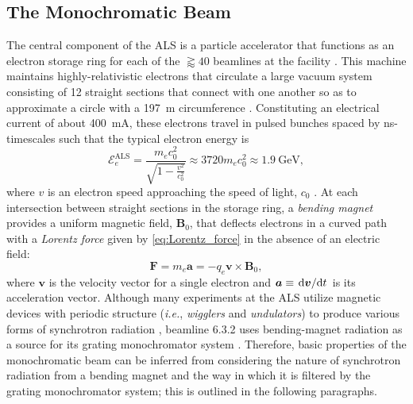 \subsection{The Monochromatic Beam}\label{sec:als_beam}
The central component of the ALS is a particle accelerator that functions as an electron storage ring for each of the $\gtrapprox 40$ beamlines at the facility \cite{ALS_about}. 
This machine maintains highly-relativistic electrons that circulate a large vacuum system consisting of \num{12} straight sections that connect with one another so as to approximate a circle with a \SI{197}{\metre} circumference \cite{Attwood17}. 
Constituting an electrical current of about \SI{400}{\milli\ampere}, these electrons travel in pulsed bunches spaced by \si{\nano\second}-timescales such that the typical electron energy is
\begin{equation}\label{eq:ALS_energy}
 \mathcal{E}_e^{\text{ALS}} = \frac{m_e c_0^2}{\sqrt{1-\frac{v^2}{c_0^2}}} \approx \num{3720} m_e c_0^2 \approx \SI{1.9}{\giga\electronvolt} ,
 \end{equation}
where $v$ is an electron speed approaching the speed of light, $c_0$ \cite{Attwood17,Underwood96}.
At each intersection between straight sections in the storage ring, a \emph{bending magnet} provides a uniform magnetic field, $\mathbold{B}_0$, that deflects electrons in a curved path with a \emph{Lorentz force} given by \cref{eq:Lorentz_force} in the absence of an electric field:
\begin{equation}\label{eq:Lorentz_force_3}
 \mathbold{F} = m_e \mathbold{a} = - q_e \mathbold{v} \times \mathbold{B}_0 ,
 \end{equation}
where $\mathbold{v}$ is the velocity vector for a single electron and $\mathbold{a} \equiv \dv*{\mathbold{v}}{t}$ is its acceleration vector. 
Although many experiments at the ALS utilize magnetic devices with periodic structure (\emph{i.e.}, \emph{wigglers} and \emph{undulators}) to produce various forms of synchrotron radiation \cite{Attwood17}, beamline 6.3.2 uses bending-magnet radiation as a source for its grating monochromator system \cite{ALS_632,Underwood96,Gullikson01}. 
Therefore, basic properties of the monochromatic beam can be inferred from considering the nature of synchrotron radiation from a bending magnet and the way in which it is filtered by the grating monochromator system; this is outlined in the following paragraphs. 

